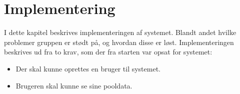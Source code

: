 \chapter{Implementering}

I dette kapitel beskrives implementeringen af systemet. Blandt andet hvilke problemer gruppen er stødt på, og hvordan disse er løst. 
Implementeringen beskrives ud fra to krav, som der fra starten var opsat for systemet:

\begin{itemize}
	\item Der skal kunne oprettes en bruger til systemet.
	\item Brugeren skal kunne se sine pooldata.
\end{itemize}


